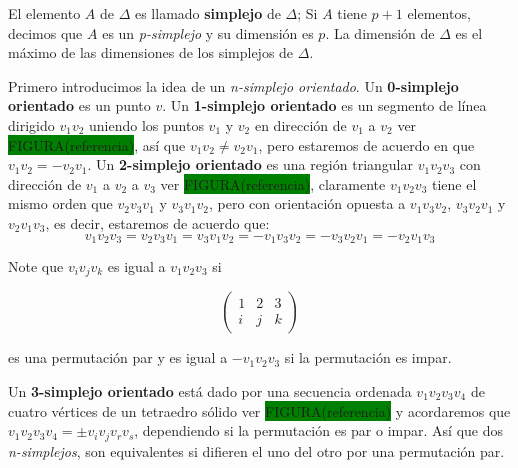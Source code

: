 \documentclass[12pt]{book}
\theoremstyle{definition}
\newcounter{in}
\newcounter{ini}
\begin{document}
{El elemento $A$ de $\Delta$ es llamado \textbf{simplejo} de
$\Delta$; Si $A$ tiene $p+1$ elementos, decimos que $A$ es un
\emph{p-simplejo} y su dimensión es $p$. La dimensión de $\Delta$
es el máximo de las dimensiones de los simplejos de $\Delta$.

Primero introducimos la idea de un \emph{n-simplejo orientado}. Un
\textbf{0-simplejo orientado} es un punto $v$. Un \textbf{1-simplejo
  orientado} es un segmento de línea dirigido $v_{1}v_{2}$ uniendo los
puntos $v_{1}$ y $v_{2}$ en dirección de $v_{1}$ a $v_{2}$ ver \setlength{\fboxsep}{0pt}\colorbox{green}{FIGURA(referencia)}, así que
$v_{1}v_{2}\neq v_{2}v_{1}$, pero estaremos de acuerdo en que
$v_{1}v_{2}=-v_{2}v_{1}$. Un \textbf{2-simplejo orientado} es una
región triangular $v_{1}v_{2}v_{3}$ con dirección de $v_{1}$ a $v_{2}$
a $v_{3}$ ver \setlength{\fboxsep}{0pt}\colorbox{green}{FIGURA(referencia)}, claramente $v_{1}v_{2}v_{3}$ tiene el mismo orden que
$v_{2}v_{3}v_{1}$ y $v_{3}v_{1}v_{2}$, pero con orientación opuesta a
$v_{1}v_{3}v_{2}$, $v_{3}v_{2}v_{1}$ y $v_{2}v_{1}v_{3}$, es decir, estaremos de acuerdo que:
$$v_{1}v_{2}v_{3}=v_{2}v_{3}v_{1}=v_{3}v_{1}v_{2}=-v_{1}v_{3}v_{2}=-v_{3}v_{2}v_{1}=-v_{2}v_{1}v_{3}$$

Note que $v_{i}v_{j}v_{k}$ es igual a $v_{1}v_{2}v_{3}$ si

\[ \left(
  \begin{array}{ccc}
    1 & 2 & 3 \\
    i & j & k 
  \end{array} 
\right)\] 

es una permutación par y es igual a $-v_{1}v_{2}v_{3}$ si la
permutación es impar.

Un \textbf{3-simplejo orientado} está dado por una secuencia ordenada
$v_{1}v_{2}v_{3}v_{4}$ de cuatro vértices de un tetraedro sólido
ver \setlength{\fboxsep}{0pt}\colorbox{green}{FIGURA(referencia)} y
acordaremos que $v_{1}v_{2}v_{3}v_{4}=\pm v_{i}v_{j}v_{r}v_{s}$,
dependiendo si la permutación es par o impar. Así que dos
\emph{n-simplejos}, son equivalentes si difieren el uno del otro
por una permutación par. 

\begin{center}
\end{center}

}
\end{document}
